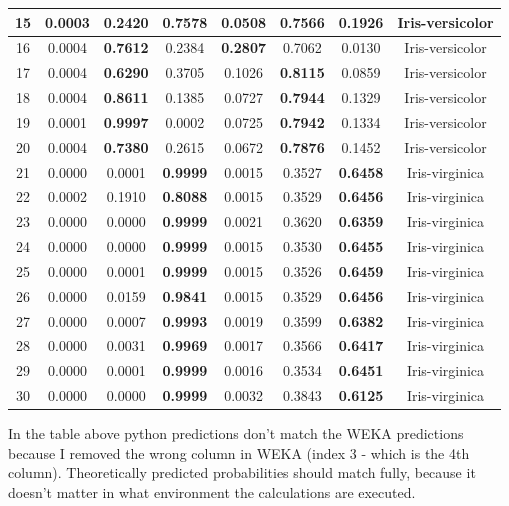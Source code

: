\documentclass{article}
\begin{document}
\begin{table}[H]
\begin{tabular}{|c|ccc|ccc|c|}
        \hline
        15 & 0.0003 & 0.2420 & \textbf{0.7578} & 0.0508 & \textbf{0.7566} & 0.1926 & Iris-versicolor \\
        \hline
        16 & 0.0004 & \textbf{0.7612} & 0.2384 & \textbf{0.2807} & 0.7062 & 0.0130 & Iris-versicolor \\
        \hline
        17 & 0.0004 & \textbf{0.6290} & 0.3705 & 0.1026 & \textbf{0.8115} & 0.0859 & Iris-versicolor \\
        \hline
        18 & 0.0004 & \textbf{0.8611} & 0.1385 & 0.0727 & \textbf{0.7944} & 0.1329 & Iris-versicolor \\
        \hline
        19 & 0.0001 & \textbf{0.9997} & 0.0002 & 0.0725 & \textbf{0.7942} & 0.1334 & Iris-versicolor \\
        \hline
        20 & 0.0004 & \textbf{0.7380} & 0.2615 & 0.0672 & \textbf{0.7876} & 0.1452 & Iris-versicolor \\
        \hline
        21 & 0.0000 & 0.0001 & \textbf{0.9999} & 0.0015 & 0.3527 & \textbf{0.6458} & Iris-virginica \\
        \hline
        22 & 0.0002 & 0.1910 & \textbf{0.8088} & 0.0015 & 0.3529 & \textbf{0.6456} & Iris-virginica \\
        \hline
        23 & 0.0000 & 0.0000 & \textbf{0.9999} & 0.0021 & 0.3620 & \textbf{0.6359} & Iris-virginica \\
        \hline
        24 & 0.0000 & 0.0000 & \textbf{0.9999} & 0.0015 & 0.3530 & \textbf{0.6455} & Iris-virginica \\
        \hline
        25 & 0.0000 & 0.0001 & \textbf{0.9999} & 0.0015 & 0.3526 & \textbf{0.6459} & Iris-virginica \\
        \hline
        26 & 0.0000 & 0.0159 & \textbf{0.9841} & 0.0015 & 0.3529 & \textbf{0.6456} & Iris-virginica \\
        \hline
        27 & 0.0000 & 0.0007 & \textbf{0.9993} & 0.0019 & 0.3599 & \textbf{0.6382} & Iris-virginica \\
        \hline
        28 & 0.0000 & 0.0031 & \textbf{0.9969} & 0.0017 & 0.3566 & \textbf{0.6417} & Iris-virginica \\
        \hline
        29 & 0.0000 & 0.0001 & \textbf{0.9999} & 0.0016 & 0.3534 & \textbf{0.6451} & Iris-virginica \\
        \hline
        30 & 0.0000 & 0.0000 & \textbf{0.9999} & 0.0032 & 0.3843 & \textbf{0.6125} & Iris-virginica \\
        \hline
    \end{tabular}
\end{table}

In the table above python predictions don't match the WEKA predictions because I removed the wrong column in WEKA (index 3 - which is the 4th column).  Theoretically predicted probabilities should match fully, because it doesn't matter in what environment the calculations are executed.

    
\end{document}
